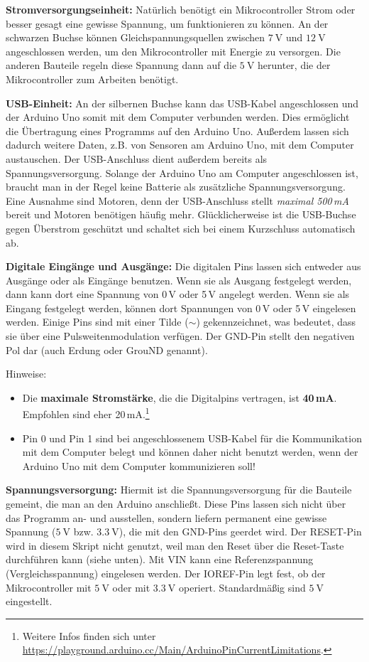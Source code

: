 \textbf{Stromversorgungseinheit:} Natürlich benötigt ein Mikrocontroller Strom oder besser gesagt eine gewisse Spannung, um funktionieren zu können. An der schwarzen Buchse können Gleichspannungsquellen zwischen $\SI{7}{\volt}$ und $\SI{12}{\volt}$ angeschlossen werden, um den Mikrocontroller mit Energie zu versorgen. Die anderen Bauteile regeln diese Spannung dann auf die $\SI{5}{\volt}$ herunter, die der Mikrocontroller zum Arbeiten benötigt.

\textbf{USB-Einheit:} An der silbernen Buchse kann das USB-Kabel angeschlossen und der Arduino Uno somit mit dem Computer verbunden werden. Dies ermöglicht die Übertragung eines Programms auf den Arduino Uno. Außerdem lassen sich dadurch weitere Daten, z.B. von Sensoren am Arduino Uno, mit dem Computer austauschen. Der USB-Anschluss dient außerdem bereits als Spannungsversorgung. Solange der Arduino Uno am Computer angeschlossen ist, braucht man in der Regel keine Batterie als zusätzliche Spannungsversorgung. Eine Ausnahme sind Motoren, denn der USB-Anschluss stellt \emph{maximal 500\,mA} bereit und Motoren benötigen häufig mehr. Glücklicherweise ist die USB-Buchse gegen Überstrom geschützt und schaltet sich bei einem Kurzschluss automatisch ab.

\textbf{Digitale Eingänge und Ausgänge:} Die digitalen Pins lassen sich entweder aus Ausgänge oder als Eingänge benutzen. Wenn sie als Ausgang festgelegt werden, dann kann dort eine Spannung von 0\,V oder 5\,V angelegt werden. Wenn sie als Eingang festgelegt werden, können dort Spannungen von 0\,V oder 5\,V eingelesen werden. Einige Pins sind mit einer Tilde ($\sim$) gekennzeichnet, was bedeutet, dass sie über eine Pulsweitenmodulation verfügen. Der GND-Pin stellt den negativen Pol dar (auch Erdung oder GrouND genannt).

Hinweise: 
\begin{itemize}
	\item Die \textbf{maximale Stromstärke}, die die Digitalpins vertragen, ist \textbf{40\,mA}. Empfohlen sind eher 20\,mA.\footnote{Weitere Infos finden sich unter \url{https://playground.arduino.cc/Main/ArduinoPinCurrentLimitations}.}
	\item Pin 0 und Pin 1 sind bei angeschlossenem USB-Kabel für die Kommunikation mit dem Computer belegt und können daher nicht benutzt werden, wenn der Arduino Uno mit dem Computer kommunizieren soll!
\end{itemize}

\textbf{Spannungsversorgung:} Hiermit ist die Spannungsversorgung für die Bauteile gemeint, die man an den Arduino anschließt. Diese Pins lassen sich nicht über das Programm an- und ausstellen, sondern liefern permanent eine gewisse Spannung ($\SI{5}{\volt}$ bzw. $\SI{3,3}{\volt}$), die mit den GND-Pins geerdet wird. Der RESET-Pin wird in diesem Skript nicht genutzt, weil man den Reset über die Reset-Taste durchführen kann (siehe unten). Mit VIN kann eine Referenzspannung (Vergleichsspannung) eingelesen werden. Der IOREF-Pin legt fest, ob der Mikrocontroller mit $\SI{5}{\volt}$ oder mit $\SI{3,3}{\volt}$ operiert. Standardmäßig sind $\SI{5}{\volt}$ eingestellt.

